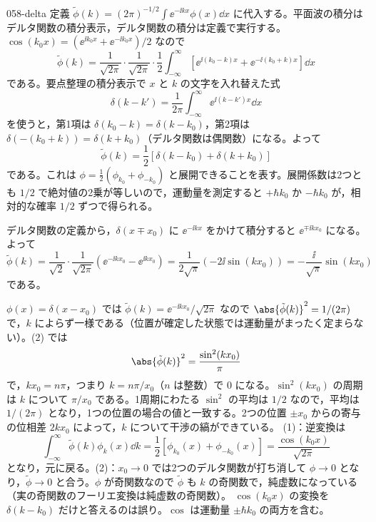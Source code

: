 \documentclass[uplatex,dvipdfmx,a4paper,11pt]{jsarticle}
\begin{document}
\begin{kaisetsu}{058-delta}
\houshin 定義 $\tilde{\phi}(k)=(2\pi)^{-1/2}\int\ee^{-\ii kx}\phi(x)\dd x$ に代入する。平面波の積分はデルタ関数の積分表示，デルタ関数の積分は定義で実行する。
\keisan {} $\cos(k_{0}x)=(\ee^{\ii k_{0}x}+\ee^{-\ii k_{0}x})/2$ なので
\[ \tilde{\phi}(k)=\frac{1}{\sqrt{2\pi}}\cdot\frac{1}{\sqrt{2\pi}}\cdot\frac{1}{2}\int_{-\infty}^{\infty}\left[\ee^{\ii(k_{0}-k)x}+\ee^{-\ii(k_{0}+k)x}\right]\dd x \]
である。要点整理の積分表示で $x$ と $k$ の文字を入れ替えた式
\[ \delta(k-k')=\frac{1}{2\pi}\int_{-\infty}^{\infty}\ee^{\ii(k-k')x}\dd x \]
を使うと，第1項は $\delta(k_{0}-k)=\delta(k-k_{0})$，第2項は $\delta(-(k_{0}+k))=\delta(k+k_{0})$（デルタ関数は偶関数）になる。よって
\[ \tilde{\phi}(k)=\frac{1}{2}\left[\delta(k-k_{0})+\delta(k+k_{0})\right] \]
である。これは $\phi=\frac{1}{2}(\phi_{k_{0}}+\phi_{-k_{0}})$ と展開できることを表す。展開係数は2つとも $1/2$ で絶対値の2乗が等しいので，運動量を測定すると $+\hbar k_{0}$ か $-\hbar k_{0}$ が，相対的な確率 $1/2$ ずつで得られる。

 デルタ関数の定義から，$\delta(x\mp x_{0})$ に $\ee^{-\ii kx}$ をかけて積分すると $\ee^{\mp\ii kx_{0}}$ になる。よって
\[ \tilde{\phi}(k)=\frac{1}{\sqrt{2}}\cdot\frac{1}{\sqrt{2\pi}}\left(\ee^{-\ii kx_{0}}-\ee^{\ii kx_{0}}\right)=\frac{1}{2\sqrt{\pi}}\left(-2\ii\sin(kx_{0})\right)=-\frac{\ii}{\sqrt{\pi}}\sin(kx_{0}) \]
である。

 $\phi(x)=\delta(x-x_{0})$ では $\tilde{\phi}(k)=\ee^{-\ii kx_{0}}/\sqrt{2\pi}$ なので $\abs{\tilde{\phi}(k)}^{2}=1/(2\pi)$ で，$k$ によらず一様である（位置が確定した状態では運動量がまったく定まらない）。(2) では
\[ \abs{\tilde{\phi}(k)}^{2}=\frac{\sin^{2}(kx_{0})}{\pi} \]
で，$kx_{0}=n\pi$，つまり $k=n\pi/x_{0}$（$n$ は整数）で $0$ になる。$\sin^{2}(kx_{0})$ の周期は $k$ について $\pi/x_{0}$ である。1周期にわたる $\sin^{2}$ の平均は $1/2$ なので，平均は $1/(2\pi)$ となり，1つの位置の場合の値と一致する。2つの位置 $\pm x_{0}$ からの寄与の位相差 $2kx_{0}$ によって，$k$ について干渉の縞ができている。
\kenzan (1)：逆変換は
\[ \int_{-\infty}^{\infty}\tilde{\phi}(k)\phi_{k}(x)\dd k=\frac{1}{2}\left[\phi_{k_{0}}(x)+\phi_{-k_{0}}(x)\right]=\frac{\cos(k_{0}x)}{\sqrt{2\pi}} \]
となり，元に戻る。(2)：$x_{0}\to0$ では2つのデルタ関数が打ち消して $\phi\to0$ となり，$\tilde{\phi}\to0$ と合う。$\phi$ が奇関数なので $\tilde{\phi}$ も $k$ の奇関数で，純虚数になっている（実の奇関数のフーリエ変換は純虚数の奇関数）。
\tsumazuki $\cos(k_{0}x)$ の変換を $\delta(k-k_{0})$ だけと答えるのは誤り。$\cos$ は運動量 $\pm\hbar k_{0}$ の両方を含む。
\end{kaisetsu}
\end{document}
